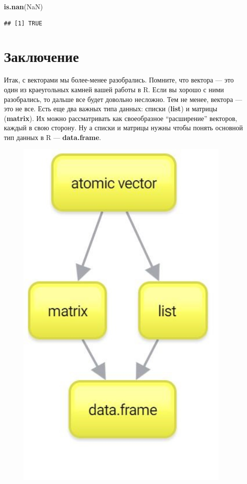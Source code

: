 \documentclass[]{book}
\newenvironment{Shaded}{\begin{snugshade}}{\end{snugshade}}
\newcommand{\KeywordTok}[1]{\textcolor[rgb]{0.13,0.29,0.53}{\textbf{#1}}}
\newcommand{\OtherTok}[1]{\textcolor[rgb]{0.56,0.35,0.01}{#1}}
\newcommand{\NormalTok}[1]{#1}
\begin{document}
\begin{Shaded}
\begin{Highlighting}[]
\KeywordTok{is.nan}\NormalTok{(}\OtherTok{NaN}\NormalTok{)}
\end{Highlighting}
\end{Shaded}

\begin{verbatim}
## [1] TRUE
\end{verbatim}

\section{Заключение}\label{vector_end}

Итак, с векторами мы более-менее разобрались. Помните, что вектора ---
это один из краеугольных камней вашей работы в R. Если вы хорошо с ними
разобрались, то дальше все будет довольно несложно. Тем не менее,
вектора --- это не все. Есть еще два важных типа данных: списки
(\textbf{list}) и матрицы (\textbf{matrix}). Их можно рассматривать как
своеобразное ``расширение'' векторов, каждый в свою сторону. Ну а списки
и матрицы нужны чтобы понять основной тип данных в R ---
\textbf{data.frame}.

\begin{figure}
\centering
\includegraphics[width=4.16667in]{images/New-Mind-Map.jpg}
\caption{}
\end{figure}
\end{document}
